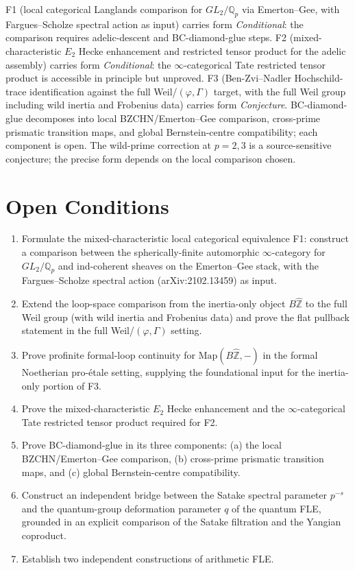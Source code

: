 \begin{remark}
\label{v4-arith:fle-comparison:rem:corrected-form}
F1 (local categorical Langlands comparison for \(GL_{2}/\mathbb{Q}_{p}\)
via Emerton--Gee, with Fargues--Scholze spectral action as input)
carries form \emph{Conditional}: the comparison requires
adelic-descent and BC-diamond-glue steps.
F2 (mixed-characteristic \(E_{2}\) Hecke enhancement and restricted
tensor product for the adelic assembly) carries form
\emph{Conditional}: the \(\infty\)-categorical Tate restricted
tensor product is accessible in principle but unproved.
F3 (Ben-Zvi--Nadler Hochschild-trace identification against the full
Weil/\((\varphi,\Gamma)\) target, with the full Weil group including
wild inertia and Frobenius data) carries form \emph{Conjecture}.
BC-diamond-glue decomposes into local BZCHN/Emerton--Gee
comparison, cross-prime prismatic transition maps, and global
Bernstein-centre compatibility; each component is open.
The wild-prime correction at \(p = 2, 3\) is a source-sensitive
conjecture; the precise form depends on the local comparison chosen.
\end{remark}

\section{Open Conditions}
\label{v4-arith:fle-comparison:open-conditions}

\begin{enumerate}
\item Formulate the mixed-characteristic local categorical
equivalence F1: construct a comparison between the spherically-finite
automorphic \(\infty\)-category for \(GL_{2}/\mathbb{Q}_{p}\) and
ind-coherent sheaves on the Emerton--Gee stack, with the
Fargues--Scholze spectral action (arXiv:2102.13459) as input.
\item Extend the loop-space comparison from the inertia-only object
\(B\widehat{\mathbb{Z}}\) to the full Weil group (with wild inertia
and Frobenius data) and prove the flat pullback statement in the full
Weil/\((\varphi,\Gamma)\) setting.
\item Prove profinite formal-loop continuity for
\(\mathrm{Map}(B\widehat{\mathbb{Z}}, -)\) in the formal Noetherian
pro-\'etale setting, supplying the foundational input for the
inertia-only portion of F3.
\item Prove the mixed-characteristic \(E_{2}\) Hecke enhancement and
the \(\infty\)-categorical Tate restricted tensor product required for
F2.
\item Prove BC-diamond-glue in its three components: (a) the local
BZCHN/Emerton--Gee comparison, (b) cross-prime prismatic transition
maps, and (c) global Bernstein-centre compatibility.
\item Construct an independent bridge between the Satake spectral
parameter \(p^{-s}\) and the quantum-group deformation parameter
\(q\) of the quantum FLE, grounded in an explicit comparison of the
Satake filtration and the Yangian coproduct.
\item Establish two independent constructions of arithmetic FLE.
\end{enumerate}

